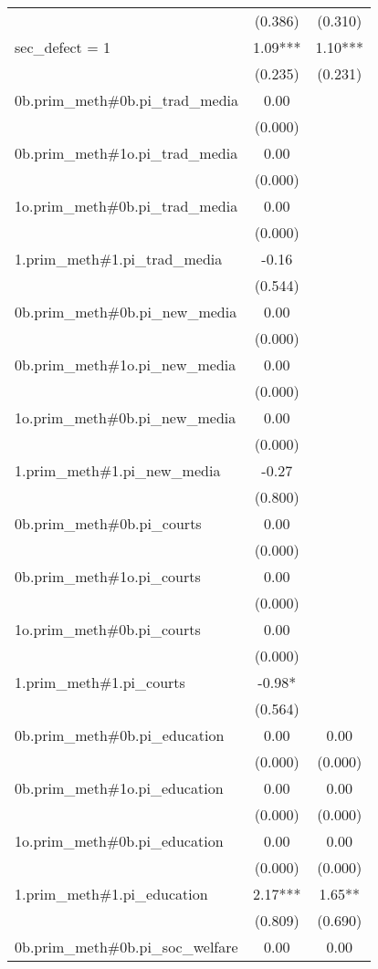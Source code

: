 \documentclass[]{article}
\begin{document}
\begin{tabular}{lcc}
 & (0.386) & (0.310) \\
sec\_defect = 1 & 1.09*** & 1.10*** \\
 & (0.235) & (0.231) \\
0b.prim\_meth\#0b.pi\_trad\_media & 0.00 &  \\
 & (0.000) &  \\
0b.prim\_meth\#1o.pi\_trad\_media & 0.00 &  \\
 & (0.000) &  \\
1o.prim\_meth\#0b.pi\_trad\_media & 0.00 &  \\
 & (0.000) &  \\
1.prim\_meth\#1.pi\_trad\_media & -0.16 &  \\
 & (0.544) &  \\
0b.prim\_meth\#0b.pi\_new\_media & 0.00 &  \\
 & (0.000) &  \\
0b.prim\_meth\#1o.pi\_new\_media & 0.00 &  \\
 & (0.000) &  \\
1o.prim\_meth\#0b.pi\_new\_media & 0.00 &  \\
 & (0.000) &  \\
1.prim\_meth\#1.pi\_new\_media & -0.27 &  \\
 & (0.800) &  \\
0b.prim\_meth\#0b.pi\_courts & 0.00 &  \\
 & (0.000) &  \\
0b.prim\_meth\#1o.pi\_courts & 0.00 &  \\
 & (0.000) &  \\
1o.prim\_meth\#0b.pi\_courts & 0.00 &  \\
 & (0.000) &  \\
1.prim\_meth\#1.pi\_courts & -0.98* &  \\
 & (0.564) &  \\
0b.prim\_meth\#0b.pi\_education & 0.00 & 0.00 \\
 & (0.000) & (0.000) \\
0b.prim\_meth\#1o.pi\_education & 0.00 & 0.00 \\
 & (0.000) & (0.000) \\
1o.prim\_meth\#0b.pi\_education & 0.00 & 0.00 \\
 & (0.000) & (0.000) \\
1.prim\_meth\#1.pi\_education & 2.17*** & 1.65** \\
 & (0.809) & (0.690) \\
0b.prim\_meth\#0b.pi\_soc\_welfare & 0.00 & 0.00 \\

\end{tabular}
\end{document}
